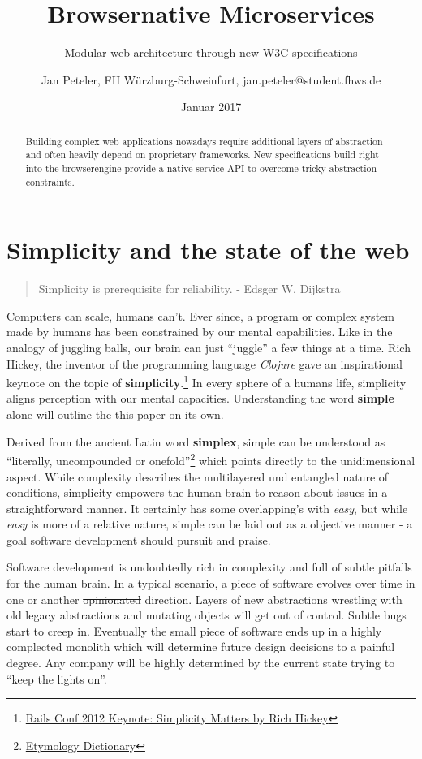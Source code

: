 \documentclass[]{assets/latex/ieee}
\title{Browsernative Microservices}
\subtitle{Modular web architecture through new W3C specifications}
\author{Jan Peteler, FH Würzburg-Schweinfurt, jan.peteler@student.fhws.de}
\date{Januar 2017}
\begin{document}
\maketitle
\begin{abstract}
Building complex web applications nowadays require additional layers of
abstraction and often heavily depend on proprietary frameworks. New
specifications build right into the browserengine provide a native
service API to overcome tricky abstraction constraints.
\end{abstract}

\section{Simplicity and the state of the
web}\label{simplicity-and-the-state-of-the-web}

\begin{quote}
Simplicity is prerequisite for reliability. - Edsger W. Dijkstra
\end{quote}

Computers can scale, humans can't. Ever since, a program or complex
system made by humans has been constrained by our mental capabilities.
Like in the analogy of juggling balls, our brain can just ``juggle'' a
few things at a time. Rich Hickey, the inventor of the programming
language \emph{Clojure} gave an inspirational keynote on the topic of
\textbf{simplicity}.\footnote{\href{https://www.youtube.com/watch?v=rI8tNMsozo0\&t=46s}{Rails
  Conf 2012 Keynote: Simplicity Matters by Rich Hickey}} In every sphere
of a humans life, simplicity aligns perception with our mental
capacities. Understanding the word \textbf{simple} alone will outline
the this paper on its own.

Derived from the ancient Latin word \textbf{simplex}, simple can be
understood as ``literally, uncompounded or onefold''\footnote{\href{http://www.etymonline.com/index.php?term=simple}{Etymology
  Dictionary}} which points directly to the unidimensional aspect. While
complexity describes the multilayered und entangled nature of
conditions, simplicity empowers the human brain to reason about issues
in a straightforward manner. It certainly has some overlapping's with
\emph{easy}, but while \emph{easy} is more of a relative nature, simple
can be laid out as a objective manner - a goal software development
should pursuit and praise.

Software development is undoubtedly rich in complexity and full of
subtle pitfalls for the human brain. In a typical scenario, a piece of
software evolves over time in one or another \sout{opinionated}
direction. Layers of new abstractions wrestling with old legacy
abstractions and mutating objects will get out of control. Subtle bugs
start to creep in. Eventually the small piece of software ends up in a
highly complected monolith which will determine future design decisions
to a painful degree. Any company will be highly determined by the
current state trying to ``keep the lights on''.
\end{document}

